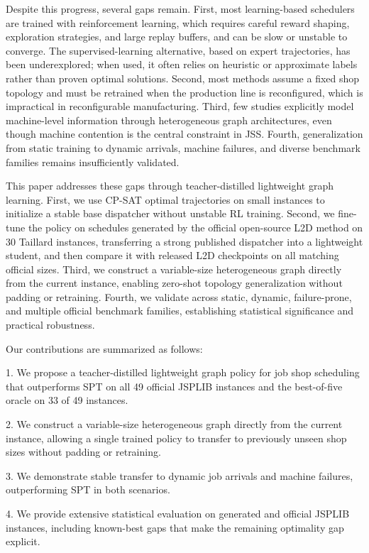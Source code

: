 \documentclass{article}
\begin{document}
Despite this progress, several gaps remain. First, most learning-based schedulers are trained with reinforcement learning, which requires careful reward shaping, exploration strategies, and large replay buffers, and can be slow or unstable to converge. The supervised-learning alternative, based on expert trajectories, has been underexplored; when used, it often relies on heuristic or approximate labels rather than proven optimal solutions. Second, most methods assume a fixed shop topology and must be retrained when the production line is reconfigured, which is impractical in reconfigurable manufacturing. Third, few studies explicitly model machine-level information through heterogeneous graph architectures, even though machine contention is the central constraint in JSS. Fourth, generalization from static training to dynamic arrivals, machine failures, and diverse benchmark families remains insufficiently validated.

This paper addresses these gaps through teacher-distilled lightweight graph learning. First, we use CP-SAT optimal trajectories on small instances to initialize a stable base dispatcher without unstable RL training. Second, we fine-tune the policy on schedules generated by the official open-source L2D method on 30 Taillard instances, transferring a strong published dispatcher into a lightweight student, and then compare it with released L2D checkpoints on all matching official sizes. Third, we construct a variable-size heterogeneous graph directly from the current instance, enabling zero-shot topology generalization without padding or retraining. Fourth, we validate across static, dynamic, failure-prone, and multiple official benchmark families, establishing statistical significance and practical robustness.

Our contributions are summarized as follows:

1. We propose a teacher-distilled lightweight graph policy for job shop scheduling that outperforms SPT on all 49 official JSPLIB instances and the best-of-five oracle on 33 of 49 instances.

2. We construct a variable-size heterogeneous graph directly from the current instance, allowing a single trained policy to transfer to previously unseen shop sizes without padding or retraining.

3. We demonstrate stable transfer to dynamic job arrivals and machine failures, outperforming SPT in both scenarios.

4. We provide extensive statistical evaluation on generated and official JSPLIB instances, including known-best gaps that make the remaining optimality gap explicit.
\end{document}
